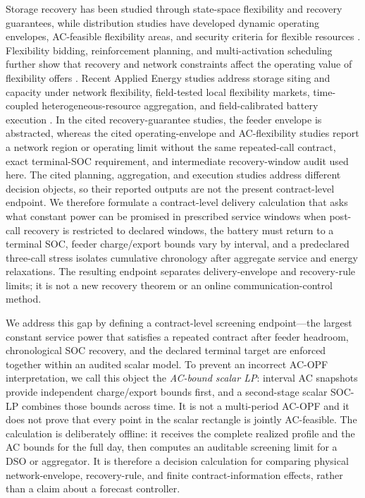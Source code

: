 \documentclass[11pt]{article}
\begin{document}
Storage recovery has been studied through state-space flexibility and recovery guarantees, while distribution studies have developed dynamic operating envelopes, AC-feasible flexibility areas, and security criteria for flexible resources \cite{Evans2022Recovery,Giraldo2023RiskEV,Xiao2025SRC,Lankeshwara2025DOE,Cheng2026FOR,Ji2019Flexibility}. Flexibility bidding, reinforcement planning, and multi-activation scheduling further show that recovery and network constraints affect the operating value of flexibility offers \cite{Wanapinit2022FlexBidding,Wang2026Communication,Klyapovskiy2019VoF,Karneluti2026EDR}. Recent Applied Energy studies address storage siting and capacity under network flexibility, field-tested local flexibility markets, time-coupled heterogeneous-resource aggregation, and field-calibrated battery execution \cite{Jiang2025ESS,Heinrich2020EcoGrid,Hai2026Aggregation,Cortes2026Execution}. In the cited recovery-guarantee studies, the feeder envelope is abstracted, whereas the cited operating-envelope and AC-flexibility studies report a network region or operating limit without the same repeated-call contract, exact terminal-SOC requirement, and intermediate recovery-window audit used here. The cited planning, aggregation, and execution studies address different decision objects, so their reported outputs are not the present contract-level endpoint. We therefore formulate a contract-level delivery calculation that asks what constant power can be promised in prescribed service windows when post-call recovery is restricted to declared windows, the battery must return to a terminal SOC, feeder charge/export bounds vary by interval, and a predeclared three-call stress isolates cumulative chronology after aggregate service and energy relaxations. The resulting endpoint separates delivery-envelope and recovery-rule limits; it is not a new recovery theorem or an online communication-control method.

We address this gap by defining a contract-level screening endpoint—the largest constant service power that satisfies a repeated contract after feeder headroom, chronological SOC recovery, and the declared terminal target are enforced together within an audited scalar model. To prevent an incorrect AC-OPF interpretation, we call this object the \emph{AC-bound scalar LP}: interval AC snapshots provide independent charge/export bounds first, and a second-stage scalar SOC-LP combines those bounds across time. It is not a multi-period AC-OPF and it does not prove that every point in the scalar rectangle is jointly AC-feasible. The calculation is deliberately offline: it receives the complete realized profile and the AC bounds for the full day, then computes an auditable screening limit for a DSO or aggregator. It is therefore a decision calculation for comparing physical network-envelope, recovery-rule, and finite contract-information effects, rather than a claim about a forecast controller.
\end{document}
